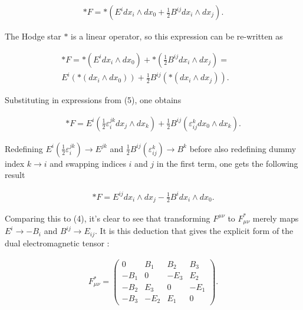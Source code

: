 \documentclass[fleqn, twocolumn, 10pt]{article}
\begin{document}
\begin{ceqn}
\begin{align*}
\ast F = \ast \left(E^idx_i\land dx_0+ \frac{1}{2}B^{ij}dx_i \land dx_j\right).
\end{align*}
\end{ceqn}

The Hodge star $\ast$ is a linear operator, so this expression can be re-written as

\begin{ceqn}
\begin{align*}
\ast F = \ast (E^idx_i\land dx_0)+ \ast\left(\frac{1}{2}B^{ij}dx_i \land dx_j\right) =\\ E^i(\ast (dx_i\land dx_0))+ \frac{1}{2}B^{ij}(\ast (dx_i \land dx_j)).\;\;\;\;\;\;\;
\end{align*}
\end{ceqn}
Substituting in expressions from (5), one obtains

\begin{ceqn}
\begin{align*}
\ast F = E^i\left(\frac{1}{2}\varepsilon^{jk}_idx_j \land dx_k\right) + \frac{1}{2}B^{ij}(\varepsilon^k_{ij}dx_0 \land dx_k).
\end{align*}
\end{ceqn}
Redefining $E^i\left(\frac{1}{2}\varepsilon^{jk}_i\right) \to E^{jk}$ and $\frac{1}{2}B^{ij}(\varepsilon^{k}_{ij}) \to B^{k}$ before also redefining dummy index $k \to i$ and swapping indices $i$ and $j$ in the first term, one gets the following result

\begin{ceqn}
\begin{align*}
\ast F = E^{ij}dx_i\land dx_j- \frac{1}{2}B^idx_i \land dx_0.
\end{align*}
\end{ceqn}

Comparing this to (4), it's clear to see that transforming $F^{\mu\nu}$ to $F^*_{\mu\nu}$ merely maps $E^i \to -B_i$ and $B^{ij} \to E_{ij}$. It is this deduction that gives the explicit form of the dual electromagnetic tensor \cite{shnir, Ian2002Lawrie, rich2006fitz, warnick2014differential, javed2019hussain, ferrari1978formulations}: 

\begin{ceqn}
\begin{align*}
F^*_{\mu\nu} = 
\begin{pmatrix}
0 & B_1 & B_2 & B_3\\
-B_1 & 0 & -E_3 & E_2\\
-B_2 & E_3 & 0 & -E_1\\
-B_3 & -E_2 & E_1 & 0
\end{pmatrix}.
\end{align*}
\end{ceqn}
\end{document}
